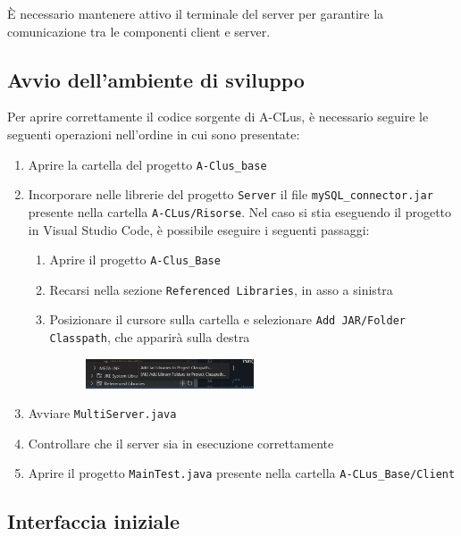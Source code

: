 \begin{tcolorbox}[colback=white, colframe=gray, title=Avvertenza]
    È necessario mantenere attivo il terminale del server per garantire la comunicazione tra le componenti client e server.
\end{tcolorbox}

\subsection*{Avvio dell'ambiente di sviluppo}

Per aprire correttamente il codice sorgente di A-CLus, è necessario seguire le seguenti operazioni nell'ordine in cui sono presentate:

\begin{enumerate}
    \item Aprire la cartella del progetto \texttt{A-Clus\_base}
    \item Incorporare nelle librerie del progetto \texttt{Server} il file \texttt{mySQL\_connector.jar} presente nella cartella \texttt{A-CLus/Risorse}. Nel caso si stia eseguendo il progetto in Visual Studio Code, è possibile eseguire i seguenti passaggi:
    \begin{enumerate}
        \item Aprire il progetto \texttt{A-Clus\_Base}
        \item Recarsi nella sezione \texttt{Referenced Libraries}, in asso a sinistra
        \item Posizionare il cursore sulla cartella e selezionare \texttt{Add JAR/Folder Classpath}, che apparirà sulla destra
        \begin{figure}[h!]
            \centering
            \includegraphics[width=0.5\textwidth]{images/refenereziare il jdbc.png}
        \end{figure}
    \end{enumerate}
    \item Avviare \texttt{MultiServer.java}
    \item Controllare che il server sia in esecuzione correttamente
    \item Aprire il progetto \texttt{MainTest.java} presente nella cartella \texttt{A-CLus\_Base/Client}
\end{enumerate}

\subsection{Interfaccia iniziale}

